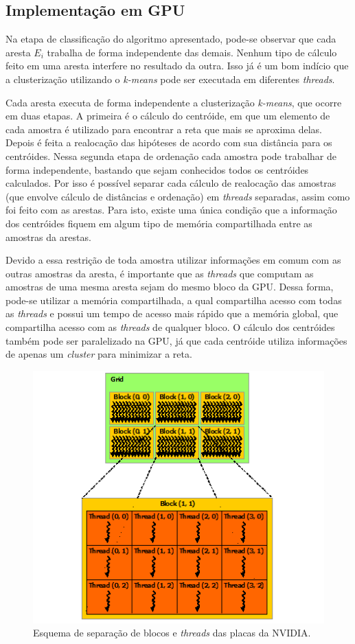 \subsection{Implementação em GPU}

Na etapa de classificação do algoritmo apresentado, pode-se observar que cada aresta $E_i$ trabalha de forma independente das demais. Nenhum tipo de cálculo feito em uma aresta interfere no resultado da outra. Isso já é um bom indício que a clusterização utilizando o \emph{k-means} pode ser executada em diferentes \emph{threads}.

Cada aresta executa de forma independente a clusterização \emph{k-means}, que ocorre em duas etapas. A primeira é o cálculo do centróide, em que um elemento de cada amostra é utilizado para encontrar a reta que mais se aproxima delas. Depois é feita a realocação das hipóteses de acordo com sua distância para os centróides. Nessa segunda etapa de ordenação cada amostra pode trabalhar de forma independente, bastando que sejam conhecidos todos os centróides calculados. Por isso é possível separar cada cálculo de realocação das amostras (que envolve cálculo de distâncias e ordenação) em \emph{threads} separadas, assim como foi feito com as arestas. Para isto, existe uma única condição que a informação dos centróides fiquem em algum tipo de memória compartilhada entre as amostras da arestas.

Devido a essa restrição de toda amostra utilizar informações em comum com as outras amostras da aresta, é importante que as \emph{threads} que computam as amostras de uma mesma aresta sejam do mesmo bloco da GPU. Dessa forma, pode-se utilizar a memória compartilhada, a qual compartilha acesso com todas as \emph{threads} e possui um tempo de acesso mais rápido que a memória global, que compartilha acesso com as \emph{threads} de qualquer bloco. O cálculo dos centróides também pode ser paralelizado na GPU, já que cada centróide utiliza informações de apenas um \emph{cluster} para minimizar a reta.

\begin{figure}[t]
\centering\includegraphics{monografia/cuda_grid}
\caption{Esquema de separação de blocos e \emph{threads} das placas da NVIDIA.}
\label{cuda_grid}
\end{figure}

